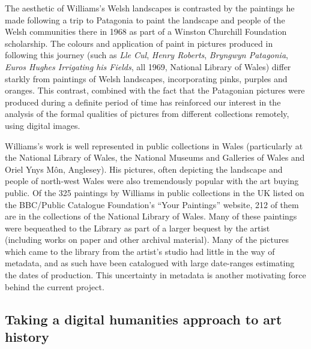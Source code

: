 
The aesthetic of Williams's Welsh landscapes is contrasted by the paintings he
made following a trip to Patagonia to paint the landscape and people of the
Welsh communities there in 1968 as part of a Winston Churchill Foundation
scholarship. The colours and application of paint in pictures produced in
following this journey (such as \emph{Lle Cul}, \emph{Henry Roberts},
\emph{Bryngwyn Patagonia}, \emph{Euros Hughes Irrigating his Fields}, all 1969,
National Library of Wales) differ starkly from paintings of Welsh landscapes,
incorporating pinks, purples and oranges. This contrast, combined with the fact
that the Patagonian pictures were produced during a definite period of time has
reinforced our interest in the analysis of the formal qualities of pictures
from different collections remotely, using digital images. 

Williams's work is well represented in public collections in Wales
(particularly at the National Library of Wales, the National Museums and
Galleries of Wales and Oriel Ynys M\^{o}n, Anglesey). His pictures, often
depicting the landscape and people of north-west Wales were also tremendously
popular with the art buying public. Of the 325 paintings by Williams in public
collections in the UK listed on the BBC/Public Catalogue Foundation's ``Your
Paintings'' website, 212 of them are in the collections of the National Library
of Wales\cite{2013Your}. Many of these paintings were bequeathed to the Library
as part of a larger bequest by the artist (including works on paper and other
archival material). Many of the pictures which came to the library from the
artist’s studio had little in the way of metadata, and as such have been
catalogued with large date-ranges estimating the dates of production.  This
uncertainty in metadata is another motivating force behind the current project.


\subsection{Taking a digital humanities approach to art history}


